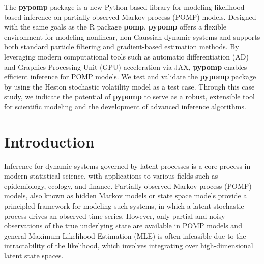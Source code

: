 \documentclass[11pt]{report}
\begin{document}
\normalsize
\justifying %
\doublespacing
The \textbf{pypomp} package is a new Python-based library for modeling likelihood-based inference on partially observed Markov process (POMP) models. Designed with the same goals as the R package \textbf{pomp}, \textbf{pypomp} offers a flexible environment for modeling nonlinear, non-Gaussian dynamic systems and supports both standard particle filtering and gradient-based estimation methods. By leveraging modern computational tools such as automatic differentiation (AD) and Graphics Processing Unit (GPU) acceleration via JAX, \textbf{pypomp} enables efficient inference for POMP models. We test and validate the \textbf{pypomp} package by using the Heston stochastic volatility model as a test case. Through this case study, we indicate the potential of \textbf{pypomp} to serve as a robust, extensible tool for scientific modeling and the development of advanced inference algorithms.
\par

\par\vspace{20pt}

\newpage


\renewcommand*\contentsname{Table of Contents}
\tableofcontents

\bigskip



\chapter{Introduction}\label{chap:intro}
Inference for dynamic systems governed by latent processes is a core process in modern statistical science, with applications to various fields such as epidemiology, ecology, and finance. Partially observed Markov process (POMP) models, also known as hidden Markov models or state space models provide a principled framework for modeling such systems, in which a latent stochastic process drives an observed time series. However, only partial and noisy observations of the true underlying state are available in POMP models and general Maximum Likelihood Estimation (MLE) is often infeasible due to the intractability of the likelihood, which involves integrating over high-dimensional latent state spaces. 
\end{document}
